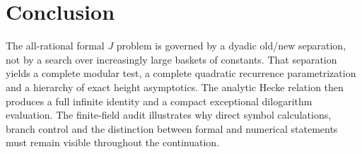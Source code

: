 \section*{Conclusion}

The all-rational formal $J$ problem is governed by a dyadic old/new
separation, not by a search over increasingly large baskets of constants.
That separation yields a complete modular test, a complete quadratic
recurrence parametrization and a hierarchy of exact height asymptotics.
The analytic Hecke relation then produces a full infinite identity and
a compact exceptional dilogarithm evaluation. The finite-field audit
illustrates why direct symbol calculations, branch control and the
distinction between formal and numerical statements must remain visible
throughout the continuation.
